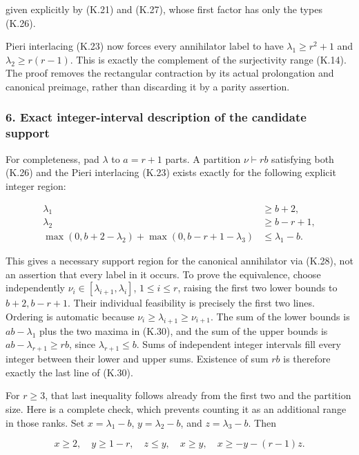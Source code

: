 \documentclass[
  10pt,
]{article}
\begin{document}
given explicitly by (K.21) and (K.27), whose first factor has only the
types (K.26).

Pieri interlacing (K.23) now forces every annihilator label to have
\(\lambda_1\ge r^2+1\) and \(\lambda_2\ge r(r-1)\). This is exactly the
complement of the surjectivity range (K.14). The proof removes the
rectangular contraction by its actual prolongation and canonical
preimage, rather than discarding it by a parity assertion.

\subsubsection{6. Exact integer-interval description of the candidate
support}\label{exact-integer-interval-description-of-the-candidate-support}

For completeness, pad \(\lambda\) to \(a=r+1\) parts. A partition
\(\nu\vdash rb\) satisfying both (K.26) and the Pieri interlacing (K.23)
exists exactly for the following explicit integer region:

\[
\begin{aligned}
\lambda_1&\ge b+2,\\
\lambda_2&\ge b-r+1,\\
\max(0,b+2-\lambda_2)+\max(0,b-r+1-\lambda_3)
&\le\lambda_1-b.
\end{aligned}
\tag{K.30}
\]

This gives a necessary support region for the canonical annihilator via
(K.28), not an assertion that every label in it occurs. To prove the
equivalence, choose independently \(\nu_i\in[\lambda_{i+1},\lambda_i]\),
\(1\le i\le r\), raising the first two lower bounds to \(b+2,b-r+1\).
Their individual feasibility is precisely the first two lines. Ordering
is automatic because \(\nu_i\ge\lambda_{i+1}\ge\nu_{i+1}\). The sum of
the lower bounds is \(ab-\lambda_1\) plus the two maxima in (K.30), and
the sum of the upper bounds is \(ab-\lambda_{r+1}\ge rb\), since
\(\lambda_{r+1}\le b\). Sums of independent integer intervals fill every
integer between their lower and upper sums. Existence of sum \(rb\) is
therefore exactly the last line of (K.30).

For \(r\ge3\), that last inequality follows already from the first two
and the partition size. Here is a complete check, which prevents
counting it as an additional range in those ranks. Set
\(x=\lambda_1-b\), \(y=\lambda_2-b\), and \(z=\lambda_3-b\). Then

\[
x\ge2,\quad y\ge1-r,\quad z\le y,\quad
x\ge y,\quad x\ge-y-(r-1)z.
\]
\end{document}
